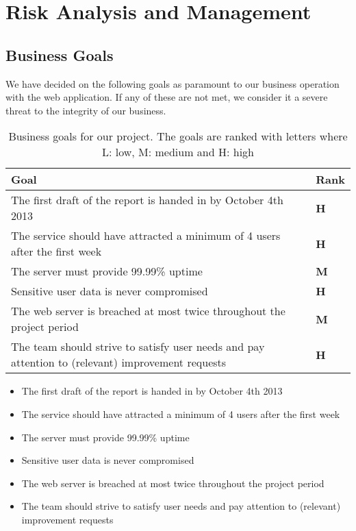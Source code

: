 \documentclass[a4paper]{article}
\begin{document}
\section{Risk Analysis and Management}


\subsection{Business Goals}
We have decided on the following goals as paramount to our business operation with the web application. If any of these are not met, we consider it a severe threat to the integrity of our business.

\begin{table}
	\begin{tabular}{|p{10cm}|l|}
		\hline
		\textbf{Goal} & \textbf{Rank} \\ \hline
        The first draft of the report is handed in by October 4th 2013 & \textbf{H} \\ \hline
The service should have attracted a minimum of 4 users after the first week & \textbf{H} \\ \hline
The server must provide 99.99\% uptime   & \textbf{M} \\ \hline
Sensitive user data is never compromised & \textbf{H} \\ \hline
The web server is breached at most twice throughout the project period &  \textbf{M} \\ \hline
The team should strive to satisfy user needs and pay attention to (relevant) improvement requests & \textbf{H} \\ \hline
	\end{tabular}
	\caption{Business goals for our project. The goals are ranked with letters where L: low, M: medium and H: high}
	\label{tab:business_goals}
\end{table}


\begin{itemize}
\item The first draft of the report is handed in by October 4th 2013
\item The service should have attracted a minimum of 4 users after the first week
\item The server must provide 99.99\% uptime
\item Sensitive user data is never compromised
\item The web server is breached at most twice throughout the project period
\item The team should strive to satisfy user needs and pay attention to (relevant) improvement requests
\end{itemize}
\end{document}
